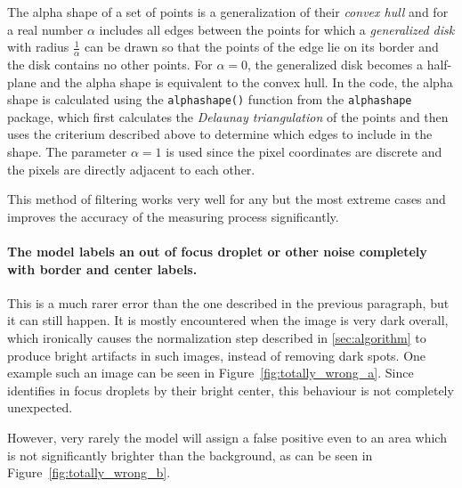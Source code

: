 The alpha shape of a set of points is a generalization of their \emph{convex hull} and for a real number $\alpha$ includes all edges between the points for which a \emph{generalized disk} with radius $\frac{1}{\alpha}$ can be drawn so that the points of the edge lie on its border and the disk contains no other points. For $\alpha=0$, the generalized disk becomes a half-plane and the alpha shape is equivalent to the convex hull. In the code, the alpha shape is calculated using the \texttt{alphashape()} function from the \texttt{alphashape} package, which first calculates the \emph{Delaunay triangulation} of the points and then uses the criterium described above to determine which edges to include in the shape. The parameter $\alpha = 1$ is used since the pixel coordinates are discrete and the pixels are directly adjacent to each other. 

This method of filtering works very well for any but the most extreme cases and improves the accuracy of the measuring process significantly.

\paragraph{The model labels an out of focus droplet or other noise completely with border and center labels.}

This is a much rarer error than the one described in the previous paragraph, but it can still happen. 
It is mostly encountered when the image is very dark overall, which ironically causes the normalization step described in \ref{sec:algorithm} to produce bright artifacts in such images, instead of removing dark spots. 
One example such an image can be seen in Figure~\ref{fig:totally_wrong_a}.
Since identifies in focus droplets by their bright center, this behaviour is not completely unexpected.

However, very rarely the model will assign a false positive even to an area which is not significantly brighter than the background, as can be seen in Figure~\ref{fig:totally_wrong_b}.

